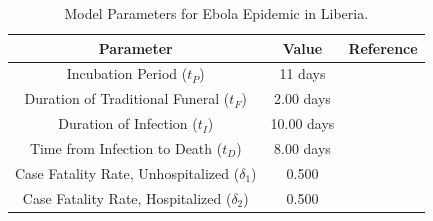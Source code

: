 \begin{table}[ht]
\caption{Model Parameters for Ebola Epidemic in Liberia.} %
\centering %
\begin{tabular}{c c c}
\hline\hline %
Parameter & Value  & Reference \\ [0.5ex]
\hline %
Incubation Period (${t_{P}}$) & 11 days & \cite{http : // www.who.int/mediacentre/factsheets/fs103/en/} \\
Duration of Traditional Funeral (${t_{F}}$) & 2.00 days & \cite{Rivers2014} \\
Duration of Infection (${t_{I}}$) & 10.00 days & \cite{Rivers2014} \\
Time from Infection to Death (${t_{D}}$) & 8.00 days & \cite{Rivers2014} \\
Case Fatality Rate, Unhospitalized ($\delta_{1}$) & 0.500 & \cite{http : // www.who.int/mediacentre/factsheets/fs103/en/} \\
Case Fatality Rate, Hospitalized ($\delta_{2}$) & 0.500 & \cite{http : // www.who.int/mediacentre/factsheets/fs103/en/} \\ [1ex]
\hline
\end{tabular}
\label{tab:knownParameters}
\end{table}



